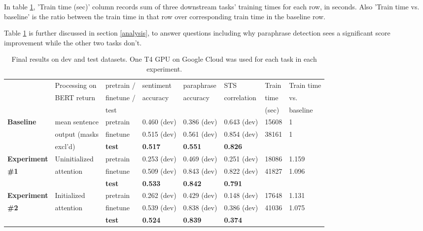 \documentclass{article}
\begin{document}
In table \ref{exp_perf_dev_test}, 'Train time (sec)' column records sum of three downstream tasks' training times for each row, in seconds. Also 'Train time vs. baseline' is the ratio between the train time in that row over corresponding train time in the baseline row. 

Table \ref{exp_perf_dev_test} is further discussed in section \ref{analysis}, to answer questions including why paraphrase detection sees a significant score improvement while the other two tasks don't. 

\begin{table}
\begin{center}
\label{exp_perf_dev_test}
    \hspace*{-1cm}\begin{tabular}{| l | l || l | l | l | l || l | l |} \hline
                      & Processing on     & pretrain /  & sentiment  & paraphrase  & STS      & Train & Train time\\
                      & BERT return    & finetune /    &  accuracy    &  accuracy     &  correlation & time  & vs. \\ 
                      &                 & test    &     &      &   & (sec) &baseline\\
                      \hline\hline

    \textbf{Baseline} & mean sentence  & pretrain    & 0.460 (dev)  & 0.386 (dev)       & 0.643 (dev)    & 15608 & 1 \\ \cline{3-8}
    \textbf{}     & output (masks & finetune    & 0.515 (dev)      & 0.561 (dev)       & 0.854 (dev) & 38161 &1 \\ \cline{3-8}
    \textbf{}     &    excl'd)         & \textbf{test}     & \textbf{0.517}      & \textbf{0.551}        &\textbf{0.826}   &     &\\  \hline \hline   
    
    \textbf{Experiment} & Uninitialized  & pretrain    & 0.253 (dev)      & 0.469 (dev)       & 0.251 (dev)   & 18086 & 1.159\\ \cline{3-8}
    \textbf{\#1}     & attention & finetune    & 0.509 (dev)      & 0.843 (dev)       &0.822 (dev)  &  41827  & 1.096\\ \cline{3-8}
    \textbf{}     &            & \textbf{test}     & \textbf{0.533}      & \textbf{0.842}        &\textbf{0.791}   &    & \\  \hline \hline  
     \textbf{Experiment} & Initialized  & pretrain    & 0.262 (dev)      & 0.429 (dev)       & 0.148 (dev)    & 17648 & 1.131\\ \cline{3-8}
    \textbf{\#2}     & attention & finetune    & 0.539 (dev)      & 0.838 (dev)       & 0.386 (dev) &  41036   &1.075\\  \cline{3-8}
    \textbf{}     &            & \textbf{test}     & \textbf{0.524}      & \textbf{0.839}        &\textbf{0.374}   &    & \\  \hline 
    \end{tabular}\newline
\caption{Final results on dev and test datasets. One T4 GPU on Google Cloud was used for each task in each experiment.}
\end{center}
\end{table}
\end{document}
